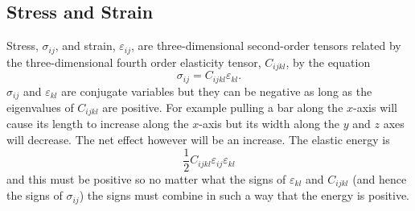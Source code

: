     \subsection{Stress and Strain}
    Stress, \(\sigma_{ij}\), and strain, \(\varepsilon_{ij}\), are three-dimensional second-order tensors related by the three-dimensional fourth order elasticity tensor, \(C_{ijkl}\), by the equation
    \[\sigma_{ij} = C_{ijkl}\varepsilon_{kl}.\]
    \(\sigma_{ij}\) and \(\varepsilon_{kl}\) are conjugate variables but they can be negative as long as the eigenvalues of \(C_{ijkl}\) are positive.
    For example pulling a bar along the \(x\)-axis will cause its length to increase along the \(x\)-axis but its width along the \(y\) and \(z\) axes will decrease.
    The net effect however will be an increase.
    The elastic energy is
    \[\frac{1}{2}C_{ijkl}\varepsilon_{ij}\varepsilon_{kl}\]
    and this must be positive so no matter what the signs of \(\varepsilon_{kl}\) and \(C_{ijkl}\) (and hence the signs of \(\sigma_{ij}\)) the signs must combine in such a way that the energy is positive.
    
